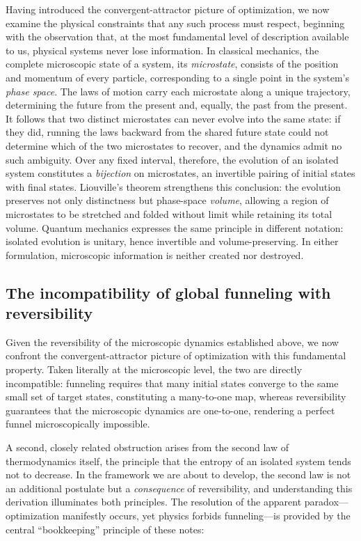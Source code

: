 \documentclass[10pt]{article}
\theoremstyle{definition}
\theoremstyle{remark}
\begin{document}
Having introduced the convergent-attractor picture of optimization, we now examine the physical constraints that any such process must respect, beginning with the observation that, at the most fundamental level of description available to us, physical systems never lose information. In classical mechanics, the complete microscopic state of a system, its \emph{microstate}, consists of the position and momentum of every particle, corresponding to a single point in the system's \emph{phase space}. The laws of motion carry each microstate along a unique trajectory, determining the future from the present and, equally, the past from the present. It follows that two distinct microstates can never evolve into the same state: if they did, running the laws backward from the shared future state could not determine which of the two microstates to recover, and the dynamics admit no such ambiguity. Over any fixed interval, therefore, the evolution of an isolated system constitutes a \emph{bijection} on microstates, an invertible pairing of initial states with final states. Liouville's theorem strengthens this conclusion: the evolution preserves not only distinctness but phase-space \emph{volume}, allowing a region of microstates to be stretched and folded without limit while retaining its total volume. Quantum mechanics expresses the same principle in different notation: isolated evolution is unitary, hence invertible and volume-preserving. In either formulation, microscopic information is neither created nor destroyed.

\subsection{The incompatibility of global funneling with reversibility}
\label{sec:nofunnel}

Given the reversibility of the microscopic dynamics established above, we now confront the convergent-attractor picture of optimization with this fundamental property. Taken literally at the microscopic level, the two are directly incompatible: funneling requires that many initial states converge to the same small set of target states, constituting a many-to-one map, whereas reversibility guarantees that the microscopic dynamics are one-to-one, rendering a perfect funnel microscopically impossible.

A second, closely related obstruction arises from the second law of thermodynamics itself, the principle that the entropy of an isolated system tends not to decrease. In the framework we are about to develop, the second law is not an additional postulate but a \emph{consequence} of reversibility, and understanding this derivation illuminates both principles. The resolution of the apparent paradox---optimization manifestly occurs, yet physics forbids funneling---is provided by the central ``bookkeeping'' principle of these notes:
\end{document}
